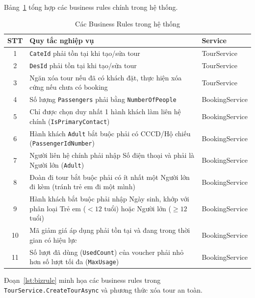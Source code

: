 Bảng~\ref{table:bizrules} tổng hợp các business rules
chính trong hệ thống.

\begin{table}[H]
  \begin{center}
    \begin{tabular}{|c|l|l|}
      \hline
      \textbf{STT} & \textbf{Quy tắc nghiệp vụ} & \textbf{Service} \\
      \hline
      1 & \texttt{CateId} phải tồn tại khi tạo/sửa tour
        & TourService \\
      2 & \texttt{DesId} phải tồn tại khi tạo/sửa tour
        & TourService \\
      3 & Ngăn xóa tour nếu đã có khách đặt, thực hiện xóa cứng nếu chưa có booking & TourService \\
      4 & Số lượng \texttt{Passengers} phải bằng \texttt{NumberOfPeople} & BookingService \\
      5 & Chỉ được chọn duy nhất 1 hành khách làm liên hệ chính (\texttt{IsPrimaryContact}) & BookingService \\
      6 & Hành khách \texttt{Adult} bắt buộc phải có CCCD/Hộ chiếu (\texttt{PassengerIdNumber}) & BookingService \\
      7 & Người liên hệ chính phải nhập Số điện thoại và phải là Người lớn (\texttt{Adult}) & BookingService \\
      8 & Đoàn đi tour bắt buộc phải có ít nhất một Người lớn đi kèm (tránh trẻ em đi một mình) & BookingService \\
      9 & Hành khách bắt buộc phải nhập Ngày sinh, khớp với phân loại Trẻ em ($<12$ tuổi) hoặc Người lớn ($\ge12$ tuổi) & BookingService \\
      10 & Mã giảm giá áp dụng phải tồn tại và đang trong thời gian có hiệu lực & BookingService \\
      11 & Số lượt đã dùng (\texttt{UsedCount}) của voucher phải nhỏ hơn số lượt tối đa (\texttt{MaxUsage}) & BookingService \\
      \hline
    \end{tabular}
  \end{center}
  \caption{Các Business Rules trong hệ thống}
  \label{table:bizrules}
\end{table}

Đoạn~\ref{lst:bizrule} minh họa các business rules trong
\texttt{TourService.CreateTourAsync} và phương thức xóa tour an toàn.

